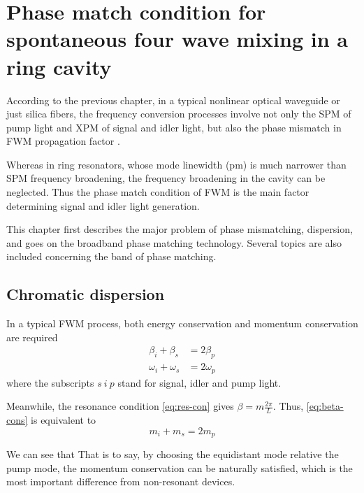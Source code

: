 
\chapter{Phase match condition for spontaneous four wave mixing in a ring cavity }\label{chap:pmc-sfwm}
According to the previous chapter, in a typical nonlinear optical waveguide or just silica fibers, the frequency conversion processes involve not only the SPM of pump light and XPM of signal and idler light, but also the phase mismatch in FWM propagation factor \cite{AGRAWAL2013397}. 

Whereas in ring resonators, 
whose mode linewidth (pm) is much narrower than SPM frequency broadening, the frequency broadening in the cavity can be neglected. Thus the phase match condition of FWM is the main factor determining signal and idler light generation. 

This chapter first describes the major problem of phase mismatching, dispersion, and goes on the broadband phase matching technology. Several topics are also included concerning the band of phase matching.

\section{Chromatic dispersion}

In a typical FWM process, both energy conservation and momentum conservation are required 
\begin{align}
  \beta_i + \beta_s & = 2 \beta_p \label{eq:beta-cons} \\
  \omega_i + \omega_s & = 2 \omega_p \label{eq:omega-cons}
\end{align}
where the subscripts $s~i~p$ stand for signal, idler and pump light.

Meanwhile, the resonance condition \autoref{eq:res-con} gives $\beta = m \frac{2 \pi}{L}$. Thus, \autoref{eq:beta-cons} is equivalent to 
\begin{equation}\label{eq:mu-cons}
  m_i + m_s = 2 m_p 
\end{equation} 
  
We can see that  That is to say, by choosing the equidistant mode relative the pump mode, the momentum conservation can be naturally satisfied, which is the most important difference from non-resonant devices.

